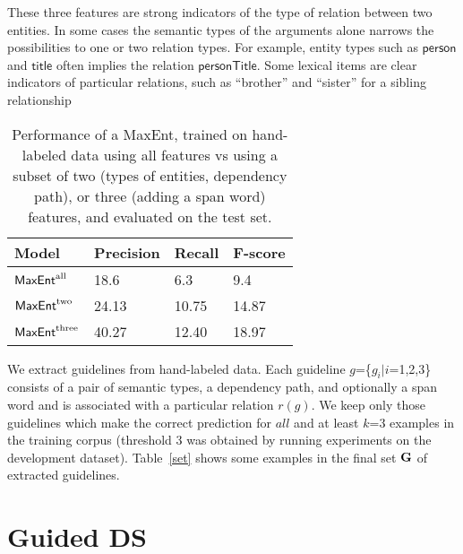 \documentclass[11pt]{article}
\begin{document}
These three features are strong indicators of the type
of relation between two entities.  In some cases the
semantic types of the arguments alone narrows the
possibilities to one or two relation types.
For example, entity types such as $\mathsf{person}$ and $\mathsf{title}$
often implies the relation $\mathsf{personTitle}$.
Some lexical items
are clear indicators of particular relations, such as ``brother'' and ``sister'' for a sibling relationship
 
 
 \begin{table} [bp]
 \vspace{8mm}
 \small
\begin{tabular}{ p{.8in}|p{.5in}| p{.5in}| p{.5in} }
\hline 
Model 					&  Precision        	   & Recall & F-score  \\ \hline
$\mathsf{MaxEnt}^{\rm all}$ 		& 18.6  	   &   	    6.3     		& 9.4  	\\ 		
  \hline
$\mathsf{MaxEnt}^{\rm two}$		&	 24.13 &	10.75 	  	&	14.87	\\ 	
  \hline
$\mathsf{MaxEnt}^{\rm three}$	&	 40.27 &	12.40 	  	&	18.97	\\ 	
  \hline
\end{tabular}
\caption{\label{font-table}Performance of a MaxEnt, trained on hand-labeled 
data using all features \cite{surdeanu11} vs using a subset of two (types of entities, dependency path), or three (adding a span word) features, and evaluated on the test set. }
\label{maxent}
\end{table}

We extract guidelines from hand-labeled data. Each guideline $g$=\{$g_i| i $=1,2,3\} consists of a pair of
semantic types, a dependency path, and optionally
a span word and is associated with a particular relation $r(g)$. We keep only those guidelines which make the correct
prediction for $all$ and at least $k$=3 examples in the training
corpus (threshold 3 was obtained by running experiments on the development dataset). Table~\ref{set} shows some examples in the final set ${\bf G}$ of extracted guidelines. 


\section{Guided DS}
\label{sec:gds}
\end{document}
